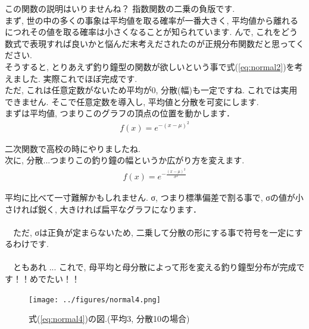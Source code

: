 \documentclass[11pt,a4paper,uplatex]{ujreport} 	%
\begin{document}
この関数の説明はいりませんね？ 指数関数の二乗の負版です.\\

まず, 世の中の多くの事象は平均値を取る確率が一番大きく, 平均値から離れるにつれその値を取る確率は小さくなることが知られています. んで, これをどう数式で表現すれば良いかと悩んだ末考えだされたのが正規分布関数だと思ってください.\\

そうすると, とりあえず釣り鐘型の関数が欲しいという事で式(\ref{eq:normal2})を考えました. 実際これでほぼ完成です.\\

ただ, これは任意定数がないため平均が0, 分散(幅)も一定ですね. これでは実用できません. そこで任意定数を導入し, 平均値と分散を可変にします. \\

まずは平均値, つまりこのグラフの頂点の位置を動かします．\\

\begin{align}
\label{eq:normal3}
f(x) = e^{-(x-\mu)^2}
\end{align}

二次関数で高校の時にやりましたね.\\

次に, 分散...つまりこの釣り鐘の幅というか広がり方を変えます. \\

\begin{align}
\label{eq:normal4}
f(x) = e^{-\frac{(x-\mu)^2}{\sigma^2}}
\end{align}

平均に比べて一寸難解かもしれません. σ, つまり標準偏差で割る事で, σの値が小さければ鋭く, 大きければ扁平なグラフになります．\\
\\
　ただ, σは正負が定まらないため, 二乗して分散の形にする事で符号を一定にするわけです. \\
\\
　ともあれ ... これで, 母平均と母分散によって形を変える釣り鐘型分布が完成です！！めでたい！！\\

\begin{figure}[H]
\label{im:normal}
  \centering
  \texttt{[image: ../figures/normal4.png]}
  \caption{式(\ref{eq:normal4})の図.(平均3, 分散10の場合)}
\end{figure}
\end{document}
